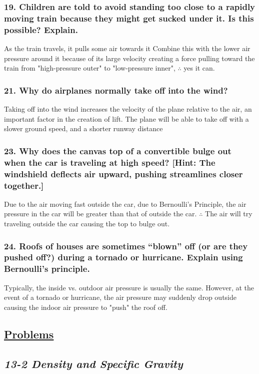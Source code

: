 \documentclass{article}
\begin{document}
\subsubsection*{
    19. Children are told to avoid standing too close to a rapidly moving
    train because they might get sucked under it. Is this possible? Explain.
}
As the train travels, it pulls some air towards it Combine this with the lower
air pressure around it because of its large velocity creating a force pulling
toward the train from "high-pressure outer" to "low-pressure inner",
$\therefore$ yes it can.
\subsubsection*{
    21. Why do airplanes normally take off into the wind?
}
Taking off into the wind increases the velocity of the plane relative to the
air, an important factor in the creation of lift. The plane will be able to take
off with a slower ground speed, and a shorter runway distance
\subsubsection*{
    23. Why does the canvas top of a convertible bulge out when
    the car is traveling at high speed? [Hint: The windshield
    deflects air upward, pushing streamlines closer together.]
}
Due to the air moving fast outside the car, due to Bernoulli's Principle, the
air pressure in the car will be greater than that of outside the car.
$\therefore$ The air will try traveling outside the car causing the top to bulge
out.
\subsubsection*{
    24. Roofs of houses are sometimes “blown” off (or are they pushed off?)
    during a tornado or hurricane. Explain using Bernoulli’s principle.
}
Typically, the inside vs. outdoor air pressure is usually the same. However, at
the event of a tornado or hurricane, the air pressure may suddenly drop outside
causing the indoor air pressure to "push" the roof off. 
\newpage
\begin{center}
    \section*{\textbf{\underline {Problems}}}
\end{center}
\begin{center}
    \subsection*{\textbf{\textit{13-2 Density and Specific Gravity}}}
\end{center}
\end{document}
